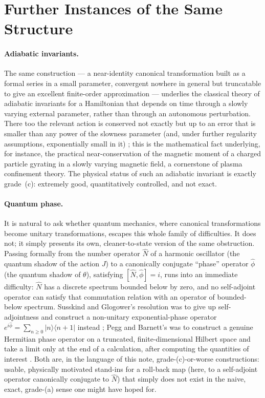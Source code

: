 \documentclass[11pt]{article}
\begin{document}
\section{Further Instances of the Same Structure}

\paragraph{Adiabatic invariants.} The same construction --- a near-identity canonical transformation built as a formal series in a small parameter, convergent nowhere in general but truncatable to give an excellent finite-order approximation --- underlies the classical theory of adiabatic invariants for a Hamiltonian that depends on time through a slowly varying external parameter, rather than through an autonomous perturbation. There too the relevant action is conserved not exactly but up to an error that is smaller than any power of the slowness parameter (and, under further regularity assumptions, exponentially small in it) \cite{Neishtadt1981}; this is the mathematical fact underlying, for instance, the practical near-conservation of the magnetic moment of a charged particle gyrating in a slowly varying magnetic field, a cornerstone of plasma confinement theory. The physical status of such an adiabatic invariant is exactly grade~(c): extremely good, quantitatively controlled, and not exact.

\paragraph{Quantum phase.} It is natural to ask whether quantum mechanics, where canonical transformations become unitary transformations, escapes this whole family of difficulties. It does not; it simply presents its own, cleaner-to-state version of the same obstruction. Passing formally from the number operator $\hat N$ of a harmonic oscillator (the quantum shadow of the action $J$) to a canonically conjugate ``phase'' operator $\hat\phi$ (the quantum shadow of $\theta$), satisfying $[\hat N,\hat\phi]=i$, runs into an immediate difficulty: $\hat N$ has a discrete spectrum bounded below by zero, and no self-adjoint operator can satisfy that commutation relation with an operator of bounded-below spectrum. Susskind and Glogower's resolution was to give up self-adjointness and construct a non-unitary exponential-phase operator $e^{i\hat\phi}=\sum_{n\ge0}|n\rangle\langle n+1|$ instead \cite{SusskindGlogower1964}; Pegg and Barnett's was to construct a genuine Hermitian phase operator on a truncated, finite-dimensional Hilbert space and take a limit only at the end of a calculation, after computing the quantities of interest \cite{PeggBarnett1988}. Both are, in the language of this note, grade-(c)-or-worse constructions: usable, physically motivated stand-ins for a roll-back map (here, to a self-adjoint operator canonically conjugate to $\hat N$) that simply does not exist in the naive, exact, grade-(a) sense one might have hoped for.
\end{document}
